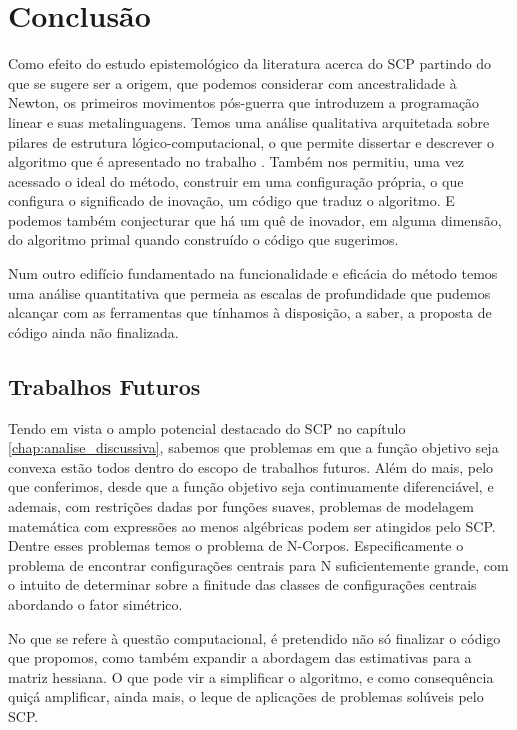 
\chapter{Conclusão}
\label{chap:conclusao}

\noindent
Como efeito do estudo epistemológico da literatura acerca do SCP partindo
do que se sugere ser a origem, que podemos considerar com ancestralidade à
Newton, os primeiros movimentos pós-guerra que introduzem a programação linear
e suas metalinguagens. Temos uma análise qualitativa arquitetada sobre pilares
de estrutura lógico-computacional, o que permite dissertar e descrever o
algoritmo que é apresentado no trabalho \cite{Still2010}. Também nos permitiu,
uma vez acessado o ideal do método, construir em uma configuração própria, o
que configura o significado de inovação, um código que traduz o algoritmo.
E podemos também conjecturar que há um quê de inovador, em alguma dimensão,
do algoritmo primal quando construído o código que sugerimos.

Num outro edifício fundamentado na funcionalidade e eficácia do método temos
uma análise quantitativa que permeia as escalas de profundidade que pudemos
alcançar com as ferramentas que tínhamos à disposição, a saber, a proposta de
código ainda não finalizada. 

\section{Trabalhos Futuros}
\label{sec:trabalhosFuturos}

\noindent
Tendo em vista o amplo potencial destacado do SCP no capítulo
\ref{chap:analise_discussiva}, sabemos que problemas em que a função
objetivo seja convexa estão todos dentro do escopo de trabalhos futuros. Além
do mais, pelo que conferimos, desde que a função objetivo seja continuamente
diferenciável, e ademais, com restrições dadas por funções suaves,
problemas de modelagem matemática com expressões ao menos algébricas podem
ser atingidos pelo SCP. Dentre esses problemas temos o problema de N-Corpos.
Especificamente o problema de encontrar configurações centrais para N
suficientemente grande, com o intuito de determinar sobre a finitude das
classes de configurações centrais abordando o fator simétrico.

No que se refere à questão computacional, é pretendido não só finalizar o
código que propomos, como também expandir a abordagem das estimativas para a
matriz hessiana. O que pode vir a simplificar o algoritmo, e como consequência
quiçá amplificar, ainda mais, o leque de aplicações de problemas solúveis pelo
SCP.

